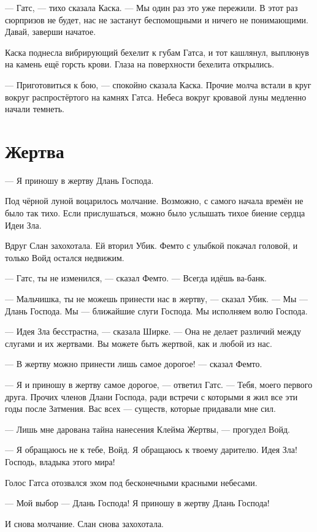 \documentclass[a4paper,12pt,fleqn]{book}\usepackage{polyglossia}\setdefaultlanguage[babelshorthands=true]{russian}\setotherlanguage{english}\defaultfontfeatures{Ligatures=TeX,Mapping=tex-text}\usepackage{xcolor}\newcommand{\ml}[3]{#2}
\begin{document}
--- Гатс, --- тихо сказала Каска.
--- Мы один раз это уже пережили.
В этот раз сюрпризов не будет, нас не застанут беспомощными и ничего не понимающими.
Давай, заверши начатое.

Каска поднесла вибрирующий бехелит к губам Гатса, и тот кашлянул, выплюнув на камень ещё горсть крови.
Глаза на поверхности бехелита открылись.

--- Приготовиться к бою, --- спокойно сказала Каска.
Прочие молча встали в круг вокруг распростёртого на камнях Гатса.
Небеса вокруг кровавой луны медленно начали темнеть.

\section{Жертва}

--- Я приношу в жертву Длань Господа.

Под чёрной луной воцарилось молчание.
Возможно, с самого начала времён не было так тихо.
Если прислушаться, можно было услышать тихое биение сердца Идеи Зла.

Вдруг Слан захохотала.
Ей вторил Убик.
Фемто с улыбкой покачал головой, и только Войд остался недвижим.

--- Гатс, ты не изменился, --- сказал Фемто.
--- Всегда идёшь ва-банк.

--- Мальчишка, ты не можешь принести нас в жертву, --- сказал Убик.
--- Мы --- Длань Господа.
Мы --- ближайшие слуги Господа.
Мы исполняем волю Господа.

--- Идея Зла бесстрастна, --- сказала Ширке.
--- Она не делает различий между слугами и их жертвами.
Вы можете быть жертвой, как и любой из нас.

--- В жертву можно принести лишь самое дорогое! --- сказал Фемто.

--- Я и приношу в жертву самое дорогое, --- ответил Гатс.
--- Тебя, моего первого друга.
Прочих членов Длани Господа, ради встречи с которыми я жил все эти годы после Затмения.
Вас всех --- существ, которые придавали мне сил.

--- Лишь мне дарована тайна нанесения Клейма Жертвы, --- прогудел Войд.

--- Я обращаюсь не к тебе, Войд.
Я обращаюсь к твоему дарителю.
Идея Зла!
Господь, владыка этого мира!

Голос Гатса отозвался эхом под бесконечными красными небесами.

--- Мой выбор --- Длань Господа!
Я приношу в жертву Длань Господа!

И снова молчание.
Слан снова захохотала.
\end{document}
